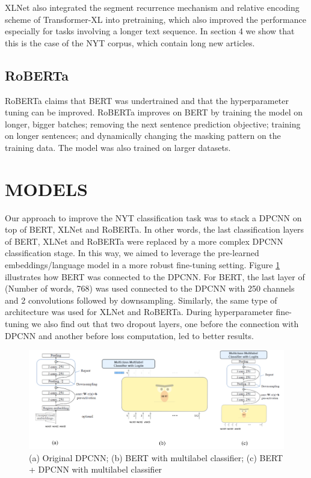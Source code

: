 \documentclass{article}
\begin{document}
XLNet also integrated the segment recurrence mechanism and relative encoding scheme of Transformer-XL  into pretraining, which also improved the performance especially for tasks involving a longer text sequence. In section 4 we show that this is the case of the NYT corpus, which contain long new articles.

\subsection{RoBERTa}

RoBERTa claims that BERT was undertrained and that the hyperparameter tuning can be improved. RoBERTa improves on BERT by training the model on longer, bigger batches; removing the next sentence prediction objective; training on longer sentences; and dynamically changing the masking pattern on the training data. The model was also trained on larger datasets. 

\section{MODELS} \label{models_section}

Our approach to improve the NYT classification task was to stack a DPCNN on top of BERT, XLNet and RoBERTa. In other words, the last classification layers of BERT, XLNet and RoBERTa were replaced by a more complex DPCNN classification stage. In this way, we aimed to leverage the pre-learned embeddings/language model in a more robust fine-tuning setting. Figure \ref{fig:bert_dpcnn_architecture} illustrates how BERT was connected to the DPCNN. For BERT, the last layer of (Number of words, 768) was used connected to the DPCNN with 250 channels and 2 convolutions followed by downsampling. Similarly, the same type of architecture was used for XLNet and RoBERTa. During hyperparameter fine-tuning we also find out that two dropout layers, one before the connection with DPCNN and another before loss computation, led to better results. 

\clearpage
\begin{figure}
    \centering
    \includegraphics[scale=0.4]{images/bert_and_dpcnn.png}
    \caption{(a) Original DPCNN; (b) BERT with multilabel classifier; (c) BERT + DPCNN with multilabel classifier}
    \label{fig:bert_dpcnn_architecture}
\end{figure}
\end{document}
